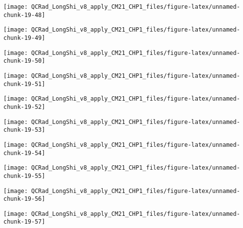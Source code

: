 \documentclass[
  10pt,
  a4paper,oneside]{article}
\begin{document}
\begin{center}\texttt{[image: QCRad\_LongShi\_v8\_apply\_CM21\_CHP1\_files/figure-latex/unnamed-chunk-19-48]} \end{center}

\begin{center}\texttt{[image: QCRad\_LongShi\_v8\_apply\_CM21\_CHP1\_files/figure-latex/unnamed-chunk-19-49]} \end{center}

\begin{center}\texttt{[image: QCRad\_LongShi\_v8\_apply\_CM21\_CHP1\_files/figure-latex/unnamed-chunk-19-50]} \end{center}

\begin{center}\texttt{[image: QCRad\_LongShi\_v8\_apply\_CM21\_CHP1\_files/figure-latex/unnamed-chunk-19-51]} \end{center}

\begin{center}\texttt{[image: QCRad\_LongShi\_v8\_apply\_CM21\_CHP1\_files/figure-latex/unnamed-chunk-19-52]} \end{center}

\begin{center}\texttt{[image: QCRad\_LongShi\_v8\_apply\_CM21\_CHP1\_files/figure-latex/unnamed-chunk-19-53]} \end{center}

\begin{center}\texttt{[image: QCRad\_LongShi\_v8\_apply\_CM21\_CHP1\_files/figure-latex/unnamed-chunk-19-54]} \end{center}

\begin{center}\texttt{[image: QCRad\_LongShi\_v8\_apply\_CM21\_CHP1\_files/figure-latex/unnamed-chunk-19-55]} \end{center}

\begin{center}\texttt{[image: QCRad\_LongShi\_v8\_apply\_CM21\_CHP1\_files/figure-latex/unnamed-chunk-19-56]} \end{center}

\begin{center}\texttt{[image: QCRad\_LongShi\_v8\_apply\_CM21\_CHP1\_files/figure-latex/unnamed-chunk-19-57]} \end{center}
\end{document}
